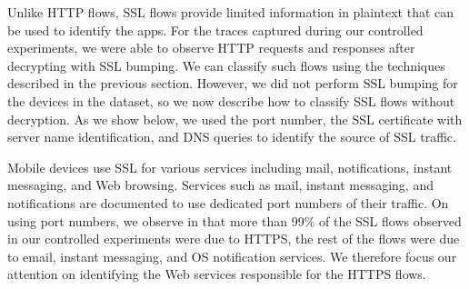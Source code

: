Unlike HTTP flows, SSL flows provide limited information in plaintext that can be used to identify the apps. 
For the traces captured during our controlled experiments, we were able to observe HTTP requests and responses 
after decrypting with SSL bumping. We can classify such flows using the techniques described in the previous section. 
However, we did not perform SSL bumping for the devices in the \mobWild dataset, so we now describe how to 
classify SSL flows without decryption. As we show below, we used the port number, the SSL certificate with server 
name identification, and DNS queries to identify the source of SSL traffic. 


Mobile devices use SSL for various services including mail, notifications, instant messaging, and Web browsing.
Services such as mail, instant messaging, and notifications are documented to use dedicated port numbers of their traffic.
On using port numbers, we observe in that more than 99\% of the SSL flows observed in our controlled experiments were due to HTTPS, the rest of the flows were due to email, instant messaging, and OS notification services. 
We therefore focus our attention on identifying the Web services responsible for the HTTPS flows. 

